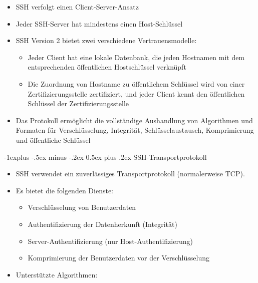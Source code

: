 \documentclass[a4paper]{article}
\makeatletter
\renewcommand{\subsection}{\@startsection{subsection}{2}{0mm}%
 {-1explus -.5ex minus -.2ex}%
 {0.5ex plus .2ex}%
 {\normalfont\normalsize\bfseries}}
\makeatother
\begin{document}
\begin{multicols}{3}
\begin{itemize}
              \begin{itemize}
                  \item
                        SSH verfolgt einen Client-Server-Ansatz
                  \item
                        Jeder SSH-Server hat mindestens einen Host-Schlüssel
                  \item
                        SSH Version 2 bietet zwei verschiedene Vertrauensmodelle:

                        \begin{itemize}
                            \item
                                  Jeder Client hat eine lokale Datenbank, die jeden Hostnamen mit
                                  dem entsprechenden öffentlichen Hostschlüssel verknüpft
                            \item
                                  Die Zuordnung von Hostname zu öffentlichem Schlüssel wird von
                                  einer Zertifizierungsstelle zertifiziert, und jeder Client kennt
                                  den öffentlichen Schlüssel der Zertifizierungsstelle
                        \end{itemize}
                  \item
                        Das Protokoll ermöglicht die vollständige Aushandlung von
                        Algorithmen und Formaten für Verschlüsselung, Integrität,
                        Schlüsselaustausch, Komprimierung und öffentliche Schlüssel
              \end{itemize}
    \end{itemize}


    \subsection{SSH-Transportprotokoll}

    \begin{itemize}
        \item
              SSH verwendet ein zuverlässiges Transportprotokoll (normalerweise
              TCP).
        \item
              Es bietet die folgenden Dienste:

              \begin{itemize}
                  \item
                        Verschlüsselung von Benutzerdaten
                  \item
                        Authentifizierung der Datenherkunft (Integrität)
                  \item
                        Server-Authentifizierung (nur Host-Authentifizierung)
                  \item
                        Komprimierung der Benutzerdaten vor der Verschlüsselung
              \end{itemize}
        \item
              Unterstützte Algorithmen:


\end{itemize}
\end{multicols}
\end{document}
